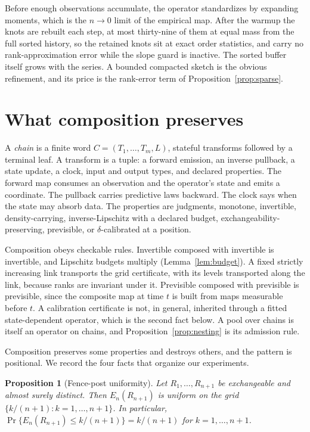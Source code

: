 \documentclass[11pt]{article}
\newtheorem{proposition}{Proposition}
\theoremstyle{remark}
\begin{document}
Before enough observations accumulate, the operator standardizes by expanding moments,
which is the $n \to 0$ limit of the empirical map. After the warmup the knots are rebuilt each step, at most
thirty-nine of them at equal mass from the full sorted history, so the retained knots
sit at exact order statistics, and carry no rank-approximation error while the slope
guard is inactive. The sorted buffer
itself grows with the series. A bounded compacted sketch is the obvious refinement, and
its price is the rank-error term of Proposition~\ref{prop:sparse}.

\section{What composition preserves}\label{sec:typing}

A \emph{chain} is a finite word
$C = (T_1, \dots, T_m, L)$, stateful transforms followed by a terminal leaf. A
transform is a tuple: a forward emission, an inverse pullback, a state update, a clock,
input and output types, and declared properties. The forward map consumes an
observation and the operator's state and emits a coordinate. The pullback carries
predictive laws backward. The clock says when the state may absorb data. The properties
are judgments, monotone, invertible, density-carrying, inverse-Lipschitz with a
declared budget, exchangeability-preserving, previsible, or $\delta$-calibrated at a position.

Composition obeys checkable rules. Invertible composed with invertible is invertible,
and Lipschitz budgets multiply (Lemma~\ref{lem:budget}). A fixed strictly increasing link
transports the grid certificate, with its levels transported along the link, because
ranks are invariant under it.
Previsible composed with previsible is previsible, since the composite map at time $t$
is built from maps measurable before $t$. A calibration certificate is not, in
general, inherited through a fitted state-dependent operator, which is the second fact
below. A pool over chains is itself an operator on chains, and
Proposition~\ref{prop:nesting} is its admission rule.

Composition preserves some properties and destroys others, and the pattern is
positional. We record the four facts that organize our experiments.

\begin{proposition}[Fence-post uniformity]\label{prop:uniform}
Let $R_1, \dots, R_{n+1}$ be exchangeable and almost surely distinct. Then
$E_n(R_{n+1})$ is uniform on the grid $\{k/(n+1) : k = 1, \dots, n+1\}$. In
particular, $\Pr\{E_n(R_{n+1}) \le k/(n+1)\} = k/(n+1)$ for
$k = 1, \dots, n+1$.
\end{proposition}
\end{document}
